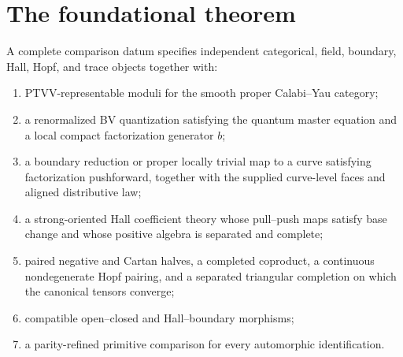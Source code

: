 \chapter{The foundational theorem}
\begin{definition}
A complete comparison datum specifies independent categorical, field,
boundary, Hall, Hopf, and trace objects together with:
\begin{enumerate}
\item PTVV-representable moduli for the smooth proper Calabi--Yau category;
\item a renormalized BV quantization satisfying the quantum master equation and a local compact factorization generator $b$;
\item a boundary reduction or proper locally trivial map to a curve satisfying factorization pushforward, together with the supplied curve-level faces and aligned distributive law;
\item a strong-oriented Hall coefficient theory whose pull--push maps satisfy base change and whose positive algebra is separated and complete;
\item paired negative and Cartan halves, a completed coproduct, a continuous nondegenerate Hopf pairing, and a separated triangular completion on which the canonical tensors converge;
\item compatible open--closed and Hall--boundary morphisms;
\item a parity-refined primitive comparison for every automorphic identification.
\end{enumerate}
\end{definition}

